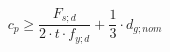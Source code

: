 \documentclass[12pt]{article}
\begin{document}
\begin{displaymath}
c_p \geq \frac {F_{s;d}} {2 \cdot t \cdot f_{y;d}} + \frac {1} {3} \cdot d_{g;nom}
\end{displaymath}
\end{document}

